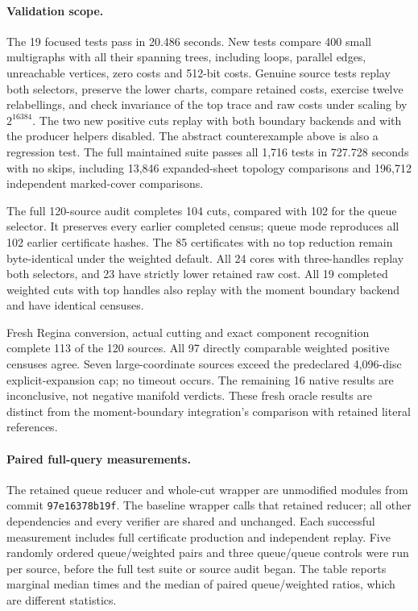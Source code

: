 \paragraph{Validation scope.}
The 19 focused tests pass in 20.486 seconds. New tests compare 400 small
multigraphs with all their spanning trees, including loops, parallel edges,
unreachable vertices, zero costs and 512-bit costs. Genuine source tests
replay both selectors, preserve the lower charts, compare retained costs,
exercise twelve relabellings, and check invariance of the top trace and raw
costs under scaling by $2^{16384}$. The two new positive cuts replay with
both boundary backends and with the producer helpers disabled. The
abstract counterexample above is also a regression test.
The full maintained suite passes all 1,716 tests in 727.728 seconds with
no skips, including 13,846 expanded-sheet topology comparisons and
196,712 independent marked-cover comparisons.

The full 120-source audit completes 104 cuts, compared with 102 for the
queue selector. It preserves every earlier completed census; queue mode
reproduces all 102 earlier certificate hashes. The 85 certificates with no
top reduction remain byte-identical under the weighted default. All 24
cores with three-handles replay both selectors, and 23 have strictly lower
retained raw cost. All 19 completed weighted cuts with top handles also
replay with the moment boundary backend and have identical censuses.

Fresh Regina conversion, actual cutting and exact component recognition
complete 113 of the 120 sources. All 97 directly comparable weighted
positive censuses agree. Seven large-coordinate sources exceed the
predeclared 4,096-disc explicit-expansion cap; no timeout occurs. The
remaining 16 native results are inconclusive, not negative manifold
verdicts. These fresh oracle results are distinct from the moment-boundary
integration's comparison with retained literal references.

\paragraph{Paired full-query measurements.}
The retained queue reducer and whole-cut wrapper are unmodified modules
from commit \texttt{97e16378b19f}. The baseline wrapper calls that retained
reducer; all other dependencies and every verifier are shared and unchanged.
Each successful measurement includes full certificate production and
independent replay. Five randomly ordered queue/weighted pairs and three
queue/queue controls were run per source, before the full test suite or
source audit began. The table reports marginal median times and the median
of paired queue/weighted ratios, which are different statistics.

